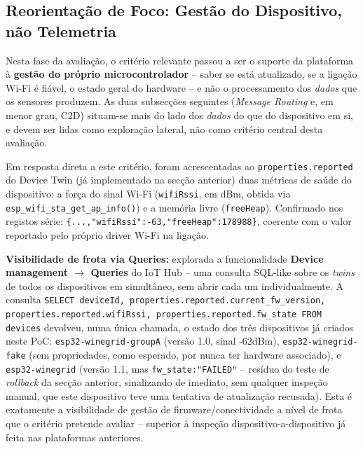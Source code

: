 \documentclass[a4paper,12pt]{article}
\begin{document}
\subsection{Reorientação de Foco: Gestão do Dispositivo, não Telemetria}
Nesta fase da avaliação, o critério relevante passou a ser o suporte da plataforma à \textbf{gestão do próprio microcontrolador} -- saber se está atualizado, se a ligação Wi-Fi é fiável, o estado geral do hardware -- e não o processamento dos \textit{dados} que os sensores produzem. As duas subsecções seguintes (\textit{Message Routing} e, em menor grau, C2D) situam-se mais do lado dos \textit{dados} do que do dispositivo em si, e devem ser lidas como exploração lateral, não como critério central desta avaliação.

Em resposta direta a este critério, foram acrescentadas ao \texttt{properties.reported} do Device Twin (já implementado na secção anterior) duas métricas de saúde do dispositivo: a força do sinal Wi-Fi (\texttt{wifiRssi}, em dBm, obtida via \texttt{esp\_wifi\_sta\_get\_ap\_info()}) e a memória livre (\texttt{freeHeap}). Confirmado nos registos série: \texttt{\{...,"wifiRssi":-63,"freeHeap":178988\}}, coerente com o valor reportado pelo próprio driver Wi-Fi na ligação.

\textbf{Visibilidade de frota via Queries:} explorada a funcionalidade \textbf{Device management $\rightarrow$ Queries} do IoT Hub -- uma consulta SQL-like sobre os \textit{twins} de todos os dispositivos em simultâneo, sem abrir cada um individualmente. A consulta \texttt{SELECT deviceId, properties.reported.current\_fw\_version, properties.reported.wifiRssi, properties.reported.fw\_state FROM devices} devolveu, numa única chamada, o estado dos três dispositivos já criados neste PoC: \texttt{esp32-winegrid-groupA} (versão 1.0, sinal -62dBm), \texttt{esp32-winegrid-fake} (sem propriedades, como esperado, por nunca ter hardware associado), e \texttt{esp32-winegrid} (versão 1.1, mas \texttt{fw\_state:"FAILED"} -- resíduo do teste de \textit{rollback} da secção anterior, sinalizando de imediato, sem qualquer inspeção manual, que este dispositivo teve uma tentativa de atualização recusada). Esta é exatamente a visibilidade de gestão de firmware/conectividade a nível de frota que o critério pretende avaliar -- superior à inspeção dispositivo-a-dispositivo já feita nas plataformas anteriores.
\end{document}
